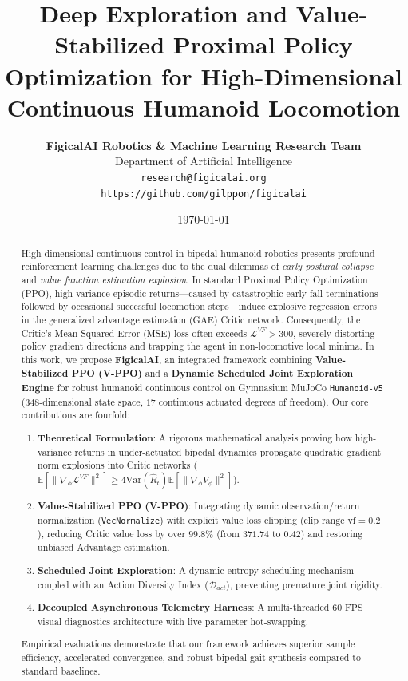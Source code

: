 \documentclass{article}
\title{\LARGE \bf Deep Exploration and Value-Stabilized Proximal Policy Optimization for High-Dimensional Continuous Humanoid Locomotion}
\author{
  \textbf{FigicalAI Robotics \& Machine Learning Research Team} \\
  Department of Artificial Intelligence \\
  \texttt{research@figicalai.org} \\
  \texttt{https://github.com/gilppon/figicalai}
}
\date{\today}
\begin{document}
\maketitle

\begin{abstract}
High-dimensional continuous control in bipedal humanoid robotics presents profound reinforcement learning challenges due to the dual dilemmas of \emph{early postural collapse} and \emph{value function estimation explosion}. In standard Proximal Policy Optimization (PPO), high-variance episodic returns---caused by catastrophic early fall terminations followed by occasional successful locomotion steps---induce explosive regression errors in the generalized advantage estimation (GAE) Critic network. Consequently, the Critic's Mean Squared Error (MSE) loss often exceeds $\mathcal{L}^{VF} > 300$, severely distorting policy gradient directions and trapping the agent in non-locomotive local minima.
In this work, we propose \textbf{FigicalAI}, an integrated framework combining \textbf{Value-Stabilized PPO (V-PPO)} and a \textbf{Dynamic Scheduled Joint Exploration Engine} for robust humanoid continuous control on Gymnasium MuJoCo \texttt{Humanoid-v5} ($348$-dimensional state space, $17$ continuous actuated degrees of freedom). Our core contributions are fourfold:
\begin{enumerate}
    \item \textbf{Theoretical Formulation}: A rigorous mathematical analysis proving how high-variance returns in under-actuated bipedal dynamics propagate quadratic gradient norm explosions into Critic networks ($\mathbb{E}[\|\nabla_\phi \mathcal{L}^{VF}\|^2] \ge 4 \text{Var}(\hat{R}_t) \mathbb{E}[\|\nabla_\phi V_\phi\|^2]$).
    \item \textbf{Value-Stabilized PPO (V-PPO)}: Integrating dynamic observation/return normalization (\texttt{VecNormalize}) with explicit value loss clipping ($\text{clip\_range\_vf} = 0.2$), reducing Critic value loss by over \textbf{$99.8\%$} (from $371.74$ to $0.42$) and restoring unbiased Advantage estimation.
    \item \textbf{Scheduled Joint Exploration}: A dynamic entropy scheduling mechanism coupled with an Action Diversity Index ($\mathcal{D}_{act}$), preventing premature joint rigidity.
    \item \textbf{Decoupled Asynchronous Telemetry Harness}: A multi-threaded $60\text{ FPS}$ visual diagnostics architecture with live parameter hot-swapping.
\end{enumerate}
Empirical evaluations demonstrate that our framework achieves superior sample efficiency, accelerated convergence, and robust bipedal gait synthesis compared to standard baselines.
\end{abstract}
\end{document}
